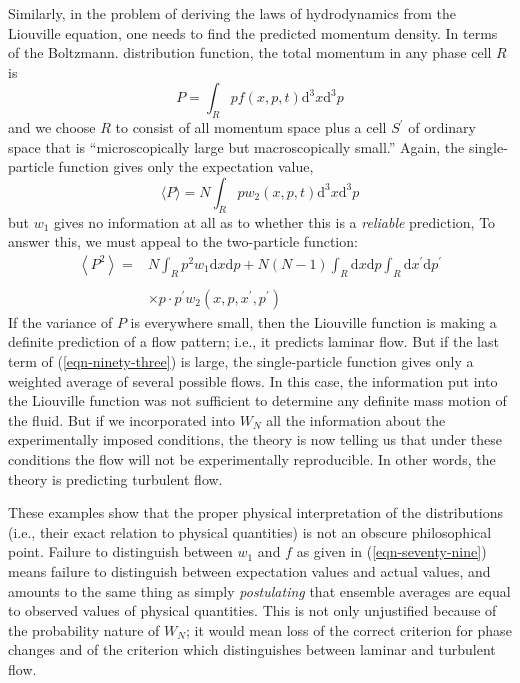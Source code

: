 \documentclass[]{article}
\begin{document}
Similarly, in the problem of deriving the laws of hydrodynamics from the Liouville equation, one needs to find the predicted momentum density. In terms of the Boltzmann. distribution function, the total momentum in any phase cell $R$ is
\begin{equation}
P =\int_{R} pf (x, p , t )\text{d}^{3} x\text{d}^{3} p
\end{equation}
and we choose $R$ to consist of all momentum space plus a cell $S ^{\prime}$ of ordinary space that is ``microscopically large but macroscopically small.'' Again, the single-particle function gives only the expectation value,
\begin{equation}
\langle P\rangle=N \int_{R} p w_{2}(x, p, t)\text{d}^{3} x\text{d}^{3} p
\end{equation}
but $w_{1}$ gives no information at all as to whether this is a \emph{reliable} prediction, To answer this, we must appeal to the two-particle function:
\begin{align}
\left\langle P ^{2}\right\rangle=& N \int_{ R } p ^{2} w_{1}\text{d}x\text{d}p+N(N-1) \int_{R}\text{d}x\text{d}p \int_{R}\text{d}x^{\prime}\text{d}p^{\prime} \nonumber \\
\label{eqn-ninety-three} \\
& \times p \cdot p^{\prime} w_{2}\left(x, p, x^{\prime}, p^{\prime}\right) \nonumber
\end{align}
If the variance of $P$ is everywhere small, then the Liouville function is making a definite prediction of a flow pattern; i.e., it predicts laminar flow. But if the last term of (\ref{eqn-ninety-three}) is large, the single-particle function gives only a weighted average of several possible flows. In this case, the information put into the Liouville function was not sufficient to determine any definite mass motion of the fluid. But if we incorporated into $W _{ N }$ all the information about the experimentally imposed conditions, the theory is now telling us that under these conditions the flow will not be experimentally reproducible. In other words, the theory is predicting turbulent flow.

These examples show that the proper physical interpretation of the distributions (i.e., their exact relation to physical quantities) is not an obscure philosophical point. Failure to distinguish between $w_{1}$ and $f$ as given in (\ref{eqn-seventy-nine}) means failure to distinguish between expectation values and actual values, and amounts to the same thing as simply \emph{postulating} that ensemble averages are equal to observed values of physical quantities. This is not only unjustified because of the probability nature of $W _{ N }$; it would mean loss of the correct criterion for phase changes and of the criterion which distinguishes between laminar and turbulent flow.
\end{document}
